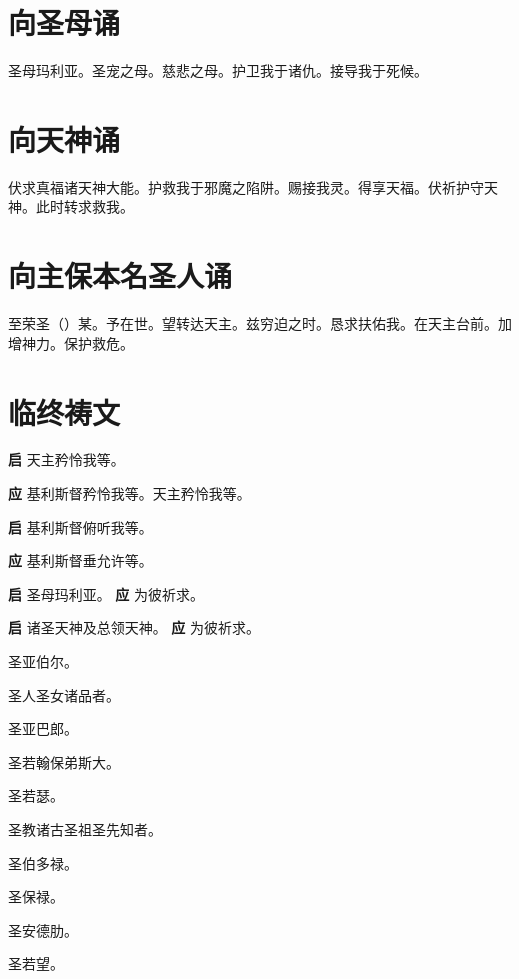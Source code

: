 \documentclass[UTF8,17pt]{ctexart}
\begin{document}
\section{向圣母诵}

圣母玛利亚。圣宠之母。慈悲之母。护卫我于诸仇。接导我于死候。

\section{向天神诵}

伏求真福诸天神⼤能。护救我于邪魔之陷阱。赐接我灵。得享天福。伏祈护守天神。此时转求救我。

\section{向主保本名圣⼈诵}

⾄荣圣（）某。予在世。望转达天主。兹穷迫之时。恳求扶佑我。在天主台前。加增神⼒。保护救危。

\section{临终祷⽂}

\textbf{启} \quad 天主矜怜我等。

\textbf{应} \quad 基利斯督矜怜我等。天主矜怜我等。

\textbf{启} \quad 基利斯督俯听我等。

\textbf{应} \quad 基利斯督垂允许等。

\textbf{启} \quad 圣母玛利亚。 \hfill \textbf{应} \quad 为彼祈求。

\textbf{启} \quad  诸圣天神及总领天神。 \hfill \textbf{应} \quad 为彼祈求。

 圣亚伯尔。

 圣⼈圣⼥诸品者。

 圣亚巴郎。

 圣若翰保弟斯⼤。

 圣若瑟。

 圣教诸古圣祖圣先知者。

 圣伯多禄。

 圣保禄。

 圣安德肋。

 圣若望。
\end{document}

